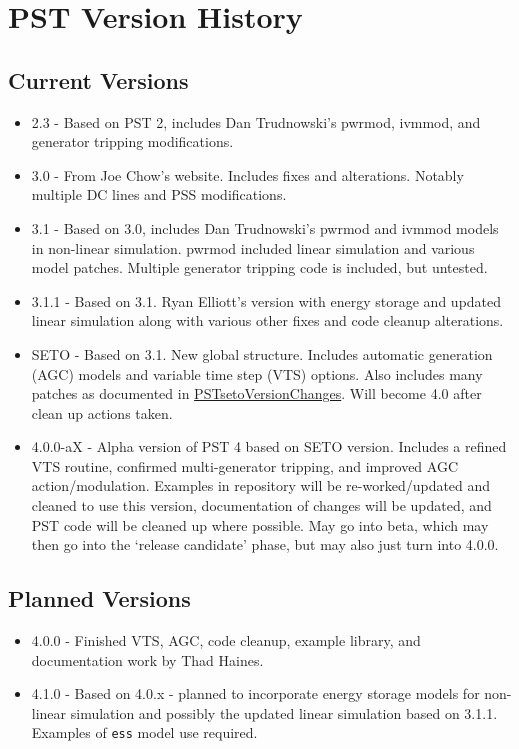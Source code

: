 \chapter{PST Version History}



\section*{Current Versions}
\begin{itemize}
 em
\item 2.3 - Based on PST 2, includes Dan Trudnowski's pwrmod, ivmmod, and generator tripping modifications.
\item 3.0 - From Joe Chow's website. 
Includes fixes and alterations. 
Notably multiple DC lines and PSS modifications.
\item 3.1 - Based on 3.0, includes Dan Trudnowski's pwrmod and ivmmod models in non-linear simulation. 
pwrmod included linear simulation and various model patches. 
Multiple generator tripping code is included, but untested.
\item 3.1.1 - Based on 3.1. Ryan Elliott's version with energy storage and updated linear simulation along with various other fixes and code cleanup alterations. 
\item SETO - Based on 3.1. New global structure. 
Includes automatic generation (AGC) models and variable time step (VTS) options. 
Also includes many patches as documented in 
\href{https://github.com/thadhaines/MT-Tech-SETO/tree/master/researchDocs/TEX/one-offs/200709-PSTsetoVersionChanges}{PSTsetoVersionChanges}. 
% 
Will become 4.0 after clean up actions taken.
\item 4.0.0-aX - Alpha version of PST 4 based on SETO version. 
Includes a refined VTS routine, confirmed multi-generator tripping, and improved AGC action/modulation.
Examples in repository will be re-worked/updated and cleaned to use this version, 
documentation of changes will be updated, 
and PST code will be cleaned up where possible.
May go into beta, which may then go into the `release candidate' phase, but may also just turn into 4.0.0.
\end{itemize}

\section*{Planned Versions}
\begin{itemize}
 em
\item 4.0.0 - Finished VTS, AGC, code cleanup, example library, and documentation work by Thad Haines.
\item 4.1.0 - Based on 4.0.x - planned to incorporate energy storage models for non-linear simulation and possibly the updated linear simulation based on 3.1.1. Examples of \verb|ess| model use required.
\end{itemize}